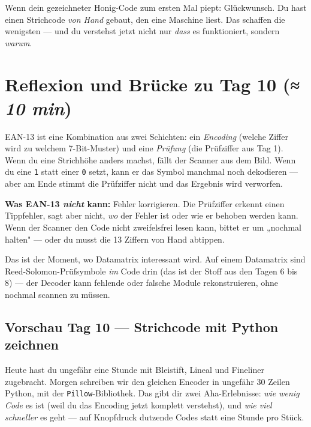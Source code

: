 Wenn dein gezeichneter Honig-Code zum ersten Mal piept: Glückwunsch.
Du hast einen Strichcode \emph{von Hand} gebaut, den eine Maschine
liest. Das schaffen die wenigsten — und du verstehst jetzt nicht nur
\emph{dass} es funktioniert, sondern \emph{warum}.

\section{Reflexion und Brücke zu Tag 10 \normalfont(\textit{≈ 10 min})}

EAN-13 ist eine Kombination aus zwei Schichten: ein \emph{Encoding}
(welche Ziffer wird zu welchem 7-Bit-Muster) und eine \emph{Prüfung}
(die Prüfziffer aus Tag 1). Wenn du eine Strichhöhe anders machst,
fällt der Scanner aus dem Bild. Wenn du eine \texttt{1} statt einer
\texttt{0} setzt, kann er das Symbol manchmal noch dekodieren — aber
am Ende stimmt die Prüfziffer nicht und das Ergebnis wird verworfen.

\textbf{Was EAN-13 \emph{nicht} kann:} Fehler korrigieren. Die
Prüfziffer erkennt einen Tippfehler, sagt aber nicht, \emph{wo} der
Fehler ist oder wie er behoben werden kann. Wenn der Scanner den
Code nicht zweifelsfrei lesen kann, bittet er um „nochmal halten" —
oder du musst die 13 Ziffern von Hand abtippen.

Das ist der Moment, wo Datamatrix interessant wird. Auf einem
Datamatrix sind Reed-Solomon-Prüfsymbole \emph{im} Code drin (das ist
der Stoff aus den Tagen 6 bis 8) — der Decoder kann fehlende oder
falsche Module rekonstruieren, ohne nochmal scannen zu müssen.

\subsection*{Vorschau Tag 10 — Strichcode mit Python zeichnen}

Heute hast du ungefähr eine Stunde mit Bleistift, Lineal und
Fineliner zugebracht. Morgen schreiben wir den gleichen Encoder in
ungefähr 30 Zeilen Python, mit der \texttt{Pillow}-Bibliothek. Das
gibt dir zwei Aha-Erlebnisse: \emph{wie wenig Code} es ist (weil du
das Encoding jetzt komplett verstehst), und \emph{wie viel schneller}
es geht — auf Knopfdruck dutzende Codes statt eine Stunde pro Stück.
